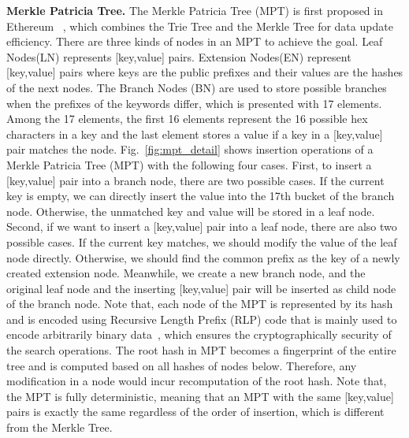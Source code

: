 \noindent\textbf{Merkle Patricia Tree.} The Merkle Patricia Tree (MPT) is first proposed in Ethereum~ \cite{wood2014ethereum, merkle_patricia_tree}, which combines the Trie Tree and the Merkle Tree for data update efficiency. There are three kinds of nodes in an MPT to achieve the goal. Leaf Nodes(LN) represents [key,value] pairs. Extension Nodes(EN) represent [key,value] pairs where keys are the public prefixes and their values are the hashes of the next nodes. The Branch Nodes (BN) are used to store possible branches when the prefixes of the keywords differ, which is presented with 17 elements. Among the 17 elements, the first 16 elements represent the 16 possible hex characters in a key and the last element stores a value if a key in a [key,value] pair matches the node. Fig.~\ref{fig:mpt_detail} shows insertion operations of a Merkle Patricia Tree (MPT) with the following four cases. First, to insert a [key,value] pair into a branch node, there are two possible cases. If the current key is empty, we can directly insert the value into the 17th bucket of the branch node. Otherwise, the unmatched key and value will be stored in a leaf node. Second, if we want to insert a [key,value] pair into a leaf node, there are also two possible cases. If the current key matches, we should modify the value of the leaf node directly. Otherwise, we should find the common prefix as the key of a newly created extension node. Meanwhile, we create a new branch node, and the original leaf node and the inserting [key,value] pair will be inserted as child node of the branch node.
Note that, each node of the MPT is represented by its hash and is encoded using Recursive Length Prefix (RLP) code that is mainly used to encode arbitrarily binary data~\cite{RLP_code}, which ensures the cryptographically security of the search operations. The root hash in MPT becomes a fingerprint of the entire tree and is computed based on all hashes of nodes below. Therefore, any modification in a node would incur recomputation of the root hash. Note that, the MPT is fully deterministic, meaning that an MPT with the same [key,value] pairs is exactly the same regardless of the order of insertion, which is different from the Merkle Tree.


